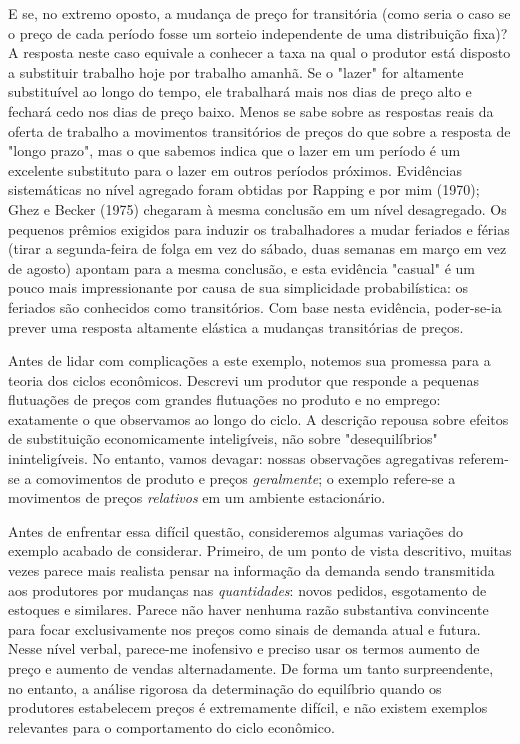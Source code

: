 \documentclass[12pt]{article}
\begin{document}
E se, no extremo oposto, a mudança de preço for transitória (como seria o caso se o preço de cada período fosse um sorteio independente de uma distribuição fixa)? A resposta neste caso equivale a conhecer a taxa na qual o produtor está disposto a substituir trabalho hoje por trabalho amanhã. Se o "lazer" for altamente substituível ao longo do tempo, ele trabalhará mais nos dias de preço alto e fechará cedo nos dias de preço baixo. Menos se sabe sobre as respostas reais da oferta de trabalho a movimentos transitórios de preços do que sobre a resposta de "longo prazo", mas o que sabemos indica que o lazer em um período é um excelente substituto para o lazer em outros períodos próximos. Evidências sistemáticas no nível agregado foram obtidas por Rapping e por mim (1970); Ghez e Becker (1975) chegaram à mesma conclusão em um nível desagregado. Os pequenos prêmios exigidos para induzir os trabalhadores a mudar feriados e férias (tirar a segunda-feira de folga em vez do sábado, duas semanas em março em vez de agosto) apontam para a mesma conclusão, e esta evidência "casual" é um pouco mais impressionante por causa de sua simplicidade probabilística: os feriados são conhecidos como transitórios. Com base nesta evidência, poder-se-ia prever uma resposta altamente elástica a mudanças transitórias de preços.

Antes de lidar com complicações a este exemplo, notemos sua promessa para a teoria dos ciclos econômicos. Descrevi um produtor que responde a pequenas flutuações de preços com grandes flutuações no produto e no emprego: exatamente o que observamos ao longo do ciclo. A descrição repousa sobre efeitos de substituição economicamente inteligíveis, não sobre "desequilíbrios" ininteligíveis. No entanto, vamos devagar: nossas observações agregativas referem-se a comovimentos de produto e preços \textit{geralmente}; o exemplo refere-se a movimentos de preços \textit{relativos} em um ambiente estacionário.

Antes de enfrentar essa difícil questão, consideremos algumas variações do exemplo acabado de considerar. Primeiro, de um ponto de vista descritivo, muitas vezes parece mais realista pensar na informação da demanda sendo transmitida aos produtores por mudanças nas \textit{quantidades}: novos pedidos, esgotamento de estoques e similares. Parece não haver nenhuma razão substantiva convincente para focar exclusivamente nos preços como sinais de demanda atual e futura. Nesse nível verbal, parece-me inofensivo e preciso usar os termos aumento de preço e aumento de vendas alternadamente. De forma um tanto surpreendente, no entanto, a análise rigorosa da determinação do equilíbrio quando os produtores estabelecem preços é extremamente difícil, e não existem exemplos relevantes para o comportamento do ciclo econômico.
\end{document}
